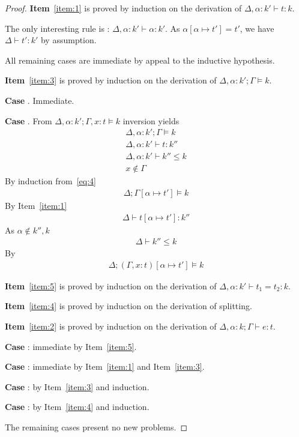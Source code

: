 \documentclass{article}
\newcommand{\TASS}[1]{#1\colon\!}
\newcommand{\TVAR}{\alpha}
\newcommand{\KENV}{\Delta}
\newcommand{\TENV}{\Gamma}
\begin{document}
\begin{proof}
  \textbf{Item}~\ref{item:1} is proved by induction on the derivation of
  $\KENV, \TASS\TVAR {k'} \vdash t : k$.

  The only interesting rule is :
  $\KENV, \TASS\TVAR {k'} \vdash \TVAR : k'$. As
  $\TVAR[\TVAR \mapsto t'] = t'$, we have $\KENV \vdash t' : k'$ by
  assumption.

  All remaining cases are immediate by appeal to the inductive hypothesis.

  \textbf{Item}~\ref{item:3} is proved by induction on the derivation of
  $\KENV, \TASS\TVAR {k'}; \TENV \models k$.

  \textbf{Case} . Immediate.

  \textbf{Case} . From $\KENV, \TASS\TVAR {k'}; \TENV, \TASS x t \models k$ inversion yields
  \begin{gather}
    \label{eq:4}
    \KENV, \TASS\TVAR {k'}; \TENV \models k \\
    \KENV, \TASS\TVAR {k'} \vdash t : k'' \\
    \KENV, \TASS\TVAR {k'} \vdash k'' \le k \\
    x \notin \TENV
  \end{gather}
  By induction from~\eqref{eq:4}
  \begin{gather}
    \KENV; \TENV[\TVAR \mapsto t'] \models k
  \end{gather}
  By Item~\ref{item:1}
  \begin{gather}
    \KENV \vdash t[\TVAR\mapsto t'] : k''
  \end{gather}
  As $\TVAR\notin k'', k$
  \begin{gather}
    \KENV \vdash k'' \le k
  \end{gather}
  By 
  \begin{gather}
    \KENV; (\TENV, \TASS x t)[\TVAR \mapsto t'] \models k
  \end{gather}

  \textbf{Item}~\ref{item:5} is proved by induction on the derivation of
  $\KENV, \TASS\TVAR{ k'} \vdash t_1 = t_2 : k$.

  \textbf{Item}~\ref{item:4} is proved by induction on the derivation of splitting.

  \textbf{Item}~\ref{item:2} is proved by induction on the derivation of
  $\KENV, \TASS\TVAR k; \TENV \vdash e : t$.

  \textbf{Case} : immediate by Item~\ref{item:5}.

  \textbf{Case} : immediate by Item~\ref{item:1} and Item~\ref{item:3}.

  \textbf{Case} : by Item~\ref{item:3} and induction.

  \textbf{Case} : by Item~\ref{item:4} and induction.

  The remaining cases present no new problems.
\end{proof}
\end{document}
